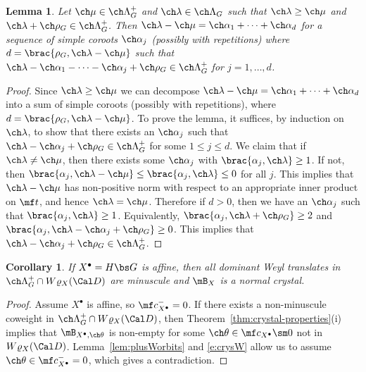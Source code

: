 \documentclass[final]{amsart}
\newtheorem{lem}[subsubsection]{Lemma}
\newtheorem{cor}[subsubsection]{Corollary}
\theoremstyle{remark}
\theoremstyle{definition}
\numberwithin{equation}{section}
\begin{document}
\begin{lem}  \label{lem:walls}
Let $\ch\mu \in \ch\Lambda_G^+$ and $\ch\lambda \in \ch\Lambda_G$
such that $\ch\lambda \ge \ch\mu$ and $\ch\lambda+\ch\rho_G \in \ch\Lambda^+_G$. 
Then $\ch\lambda-\ch\mu = \ch\alpha_1+\dotsb + \ch\alpha_d$ for a
sequence of simple coroots $\ch\alpha_j$ (possibly with repetitions)
where $d = \brac{\rho_G, \ch\lambda-\ch\mu}$
such that $\ch\lambda - \ch\alpha_1 - \dotsb - \ch\alpha_j + \ch\rho_G
\in \ch\Lambda^+_G$ for $j=1,\dotsc,d$. 
\end{lem}
\begin{proof}
Since $\ch\lambda\ge\ch\mu$ we can decompose
$\ch\lambda-\ch\mu = \ch\alpha_1+\dotsb+\ch\alpha_d$ into a sum of simple coroots (possibly with repetitions),
where $d = \brac{\rho_G,\ch\lambda-\ch\mu}$. 
To prove the lemma, it suffices, by induction on $\ch\lambda$, to 
show that there exists an $\ch\alpha_j$ such that
$\ch\lambda-\ch\alpha_j + \ch\rho_G \in \ch\Lambda^+_G$ for some 
$1\le j\le d$. 
We claim that if $\ch\lambda \ne \ch\mu$, then there exists some $\ch\alpha_j$ 
with $\brac{\alpha_j, \ch\lambda} \ge 1$. 
If not, then $\brac{\alpha_j,\ch\lambda-\ch\mu} \le \brac{\alpha_j, \ch\lambda} \le 0$ for all $j$. This implies that $\ch\lambda-\ch\mu$ 
has non-positive norm with respect to an appropriate inner product on
$\mf t$, and hence $\ch\lambda=\ch\mu$. 
Therefore if $d>0$, then we have an $\ch\alpha_j$ 
such that $\brac{\alpha_j, \ch\lambda} \ge 1$. 
Equivalently, $\brac{\alpha_j, \ch\lambda+\ch\rho_G} \ge 2$ 
and $\brac{\alpha_j, \ch\lambda-\ch\alpha_j+\ch\rho_G} \ge 0$. 
This implies that $\ch\lambda-\ch\alpha_j +\ch\rho_G \in \ch\Lambda^+_G$.
\end{proof}



\begin{cor} \label{cor:Hreductive}
If $X^\bullet = H\bs G$ is affine, then all dominant Weyl translates 
in $\ch\Lambda^+_G\cap W\varrho_X(\Cal D)$ are minuscule 
and $\mB_X$ is a normal crystal.
\end{cor}
\begin{proof}
Assume $X^\bullet$ is affine, so $\mf c_{X^\bullet}^- = 0$. 
If there exists a non-minuscule coweight in $\ch\Lambda^+_G \cap W\varrho_X(\Cal D)$, then
Theorem~\ref{thm:crystal-properties}(i) implies that $\mB_{X^\bullet, \ch\theta}$ is non-empty
for some $\ch\theta \in \mf c_{X^\bullet}\sm 0$ not in $W\varrho_X(\Cal D)$. 
Lemma~\ref{lem:plusWorbits} and \eqref{e:crysW} allow us to assume $\ch\theta \in \mf c_{X^\bullet}^- = 0$,
which gives a contradiction.
\end{proof}
\end{document}
